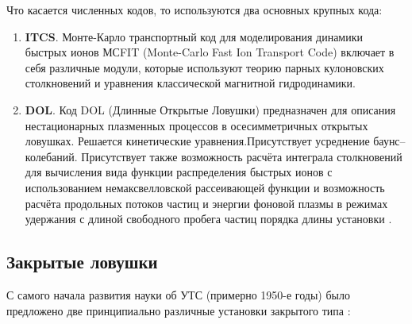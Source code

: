 Что касается численных кодов, то используются два основных крупных кода:
\begin{enumerate}
\item \textbf{ITCS}. Монте-Карло транспортный код для моделирования динамики быстрых ионов МСFIT (Monte-Carlo Fast Ion Transport Code) включает в себя различные модули, которые используют теорию парных кулоновских столкновений и уравнения классической магнитной гидродинамики.  

\item \textbf{DOL}. Код DOL (Длинные Открытые Ловушки) предназначен для описания нестационарных плазменных процессов в осесимметричных открытых ловушках. Решается кинетические уравнения.Присутствует усреднение баунс--колебаний. Присутствует также возможность расчёта интеграла столкновений для вычисления вида функции распределения быстрых ионов с использованием немаксвелловской рассеивающей функции и возможность расчёта продольных потоков частиц и энергии фоновой плазмы в режимах удержания с длиной свободного пробега частиц порядка длины установки \cite{DOL_code}.
\end{enumerate}


\subsection{Закрытые ловушки}

С самого начала развития науки об УТС (примерно 1950-е годы) было предложено две принципиально различные установки закрытого типа \cite{Kubic2007}:

